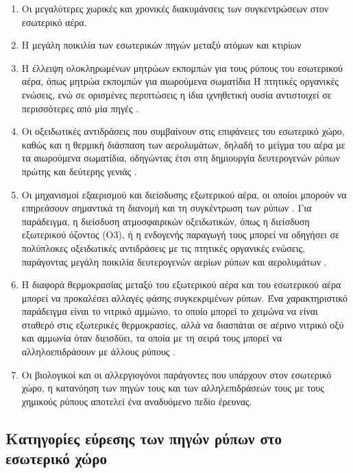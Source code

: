 \begin{enumerate}
    \item Οι μεγαλύτερες χωρικές και χρονικές διακυμάνσεις των συγκεντρώσεων στον εσωτερικό αέρα.
    \item Η μεγάλη ποικιλία των εσωτερικών πηγών μεταξύ ατόμων και κτιρίων
    \item Η έλλειψη ολοκληρωμένων μητρώων εκπομπών για τους ρύπους του εσωτερικού αέρα, όπως μητρώα εκπομπών για αιωρούμενα σωματίδια Ή πτητικές οργανικές ενώσεις, 
    ενώ σε ορισμένες περιπτώσεις η ίδια ιχνηθετική ουσία αντιστοιχεί σε περισσότερες από μία πηγές \cite{Bai2022}.
    \item Οι οξειδωτικές αντιδράσεις που συμβαίνουν στις επιφάνειες του εσωτερικό χώρο,
    καθώς και η θερμική διάσπαση των αερολυμάτων, δηλαδή το μείγμα του αέρα με τα αιωρούμενα σωματίδια, οδηγώντας έτσι στη δημιουργία δευτερογενών ρύπων πρώτης και δεύτερης γενιάς \cite{Morrison2019956}.
    \item Οι μηχανισμοί εξαερισμού και διείσδυσης εξωτερικού αέρα, οι οποίοι μπορούν να επηρεάσουν σημαντικά τη διανομή και τη συγκέντρωση των ρύπων \cite{Trompetter2018164}.
    Για παράδειγμα, η διείσδυση ατμοσφαιρικών οξειδωτικών, όπως η διείσδυση εξωτερικού όζοντος (O3), ή η ενδογενής παραγωγή τους μπορεί να οδηγήσει σε πολύπλοκες οξειδωτικές αντιδράσεις με τις πτητικές οργανικές ενώσεις,
    παράγοντας μεγάλη ποικιλία δευτερογενών αερίων ρύπων και αερολυμάτων \cite{Nazaroff2022}.
    \item Η διαφορά θερμοκρασίας μεταξύ του εξωτερικού αέρα και του εσωτερικού αέρα μπορεί να προκαλέσει αλλαγές φάσης συγκεκριμένων ρύπων.
    Ένα χαρακτηριστικό παράδειγμα είναι το νιτρικό αμμώνιο, το οποίο μπορεί το χειμώνα να είναι σταθερό στις εξωτερικές θερμοκρασίες, αλλά να διασπάται σε αέρινο νιτρικό οξύ και αμμωνία όταν διεισδύει,
    τα οποία με τη σειρά τους μπορεί να αλληλοεπιδράσουν με άλλους ρύπους \cite{Lunden20035633}.
    \item Οι βιολογικοί και οι αλλεργιογόνοι παράγοντες που υπάρχουν στον εσωτερικό χώρο, η κατανόηση των πηγών τους και των αλληλεπιδράσεών τους με τους χημικούς ρύπους αποτελεί ένα αναδυόμενο πεδίο έρευνας.

\end {enumerate}

\subsection{Κατηγορίες εύρεσης των πηγών ρύπων στο εσωτερικό χώρο}


